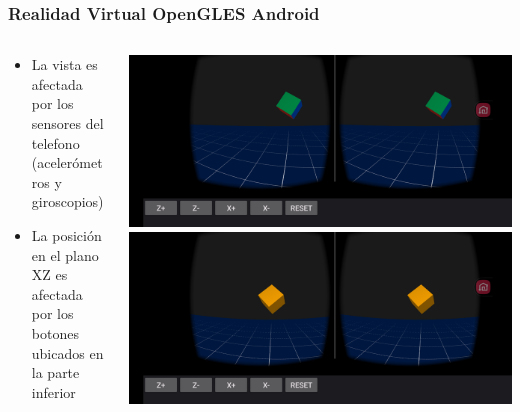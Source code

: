 \documentclass[aspectratio=169,compress]{beamer}
\begin{document}
\begin{frame}[fragile]
\frametitle{Realidad Virtual OpenGLES Android}
\begin{columns}
\begin{column}{0.48\textwidth}
\begin{itemize}
\item La vista es afectada por los sensores del telefono (acelerómetros y giroscopios)
\item La posición en el plano XZ es afectada por los botones ubicados en la parte inferior
\end{itemize}
\end{column}
\begin{column}{0.48\textwidth}
\includegraphics[width=0.99\linewidth]{PantallazosDemoTaller/Pantallazo1.png}
\includegraphics[width=0.99\linewidth]{PantallazosDemoTaller/Pantallazo2.png}
\end{column}
\end{columns}
\end{frame}
\end{document}
